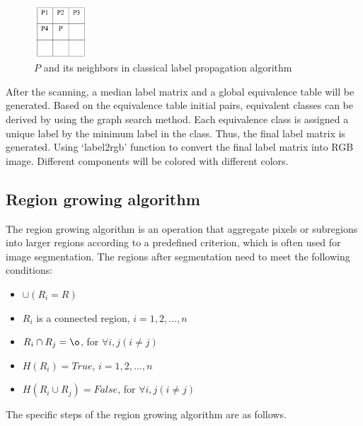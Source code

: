 \documentclass[hyperref]{article}
\theoremstyle{nonumberplain}
\begin{document}
	\begin{figure}[h]
		\centering
		\includegraphics[width=2cm]{classical neighbour.png}
		\caption{$P$ and its neighbors in classical label propagation algorithm}
		\label{fig17}
	\end{figure}

	After the scanning, a median label matrix and a global equivalence table will be generated. Based on the equivalence table initial pairs, equivalent classes can be derived by using the graph search method. Each equivalence class is assigned a unique label by the minimum label in the class. Thus, the final label matrix is generated. Using ‘label2rgb’ function to convert the final label matrix into RGB image. Different components will be colored with different colors.
	
	\subsection{Region growing algorithm}
	
	\hspace{1.0em}
	The region growing algorithm is an operation that aggregate pixels or subregions into larger regions according to a predefined criterion, which is often used for image segmentation. The regions after segmentation need to meet the following conditions: 
	
	\begin{itemize}
		\item $\cup (R_{i}=R)$
		\item $R_{i}$ is a connected region, $i=1,2,...,n$
		\item $R_{i} \cap R_{j}=\o $, for $\forall i,j(i\neq j)$
		\item $H(R_{i})=True$, $i=1,2,...,n$
		\item $H(R_{i} \cup R_{j})=False$, for $\forall i,j(i\neq j)$
	\end{itemize}

	The specific steps of the region growing algorithm are as follows.
	
\end{document}
